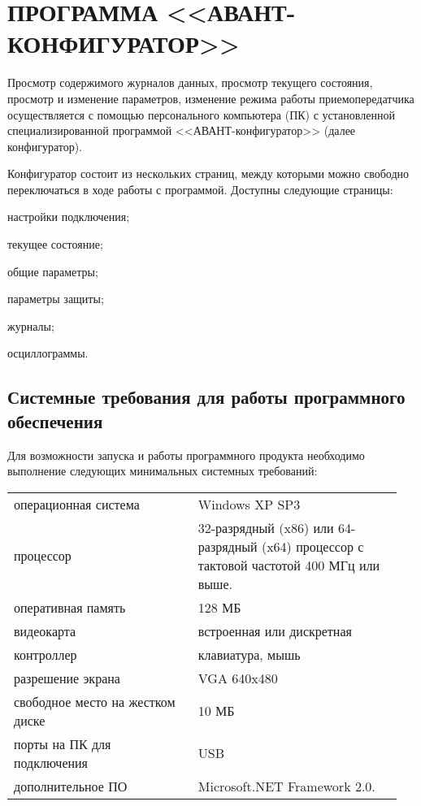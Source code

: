\section{ПРОГРАММА <<АВАНТ-КОНФИГУРАТОР>>}	\label{sec:configurator}

Просмотр содержимого журналов данных, просмотр текущего состояния, просмотр и изменение параметров, изменение режима работы приемопередатчика осуществляется с помощью персонального компьютера (ПК) с установленной специализированной программой <<АВАНТ-конфигуратор>> (далее конфигуратор).

Конфигуратор состоит из нескольких страниц, между которыми можно свободно переключаться в ходе работы с программой. Доступны следующие страницы:
\begin{list}{--}{}
\item настройки подключения;
\item текущее состояние;
\item общие параметры;
\item параметры защиты;
\item журналы;
\item осциллограммы.
\end{list}


\subsection{Системные требования для работы программного обеспечения}	\label{ssec:configurator_pc}

Для возможности запуска и работы программного продукта необходимо выполнение следующих минимальных системных требований:

\begin{center}
	\begin{tabular}{ p{0.45\linewidth} p{0.50\linewidth} }
		операционная система 				& Windows XP SP3 \\ 
		процессор 							& 32-разрядный (x86) или 64-разрядный (x64) процессор с тактовой частотой 400 МГц или выше. \\  
		оперативная память 					& 128 МБ \\
		видеокарта     						& встроенная или дискретная \\
		контроллер 							& клавиатура, мышь \\
		разрешение экрана					& VGA 640x480 \\
		свободное место на жестком диске 	& 10 МБ \\
		порты на ПК для подключения			& USB \\
		дополнительное ПО					& Microsoft.NET Framework 2.0.
	\end{tabular}
\end{center}

